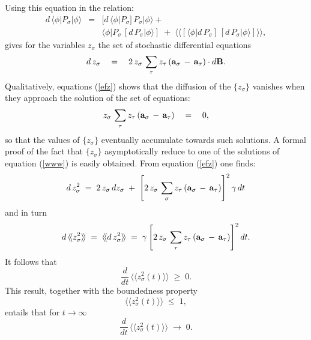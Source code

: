 \documentclass[12pt]{article}
\newcommand{\llangle}{\langle\!\langle}
\newcommand{\rrangle}{\rangle\!\rangle}
\begin{document}
Using this equation in the relation:
\begin{eqnarray*}
d\, \langle \phi|P_{\sigma}|\phi \rangle & = & [d\,\langle
\phi|P_{\sigma}]\,P_{\sigma}|
\phi \rangle + \\
& & \langle \phi|P_{\sigma} \,[d\,P_{\sigma}|\phi \rangle] \; + \;
\llangle [\langle \phi|d\,P_{\sigma}] \,[d\,P_{\sigma}|\phi
\rangle] \rrangle,
\end{eqnarray*}
gives for the variables $z_{\sigma}$ the set of stochastic
differential equations
\begin{equation} \label{efz}
d\,z_{\sigma} \quad = \quad 2\,z_{\sigma}\, \sum_{\tau} z_{\tau}\,
({\bf a}_{\sigma} \, - \, {\bf a}_{\tau})\cdot d{\bf B}.
\end{equation}
Qualitatively, equations (\ref{efz}) shows that the diffusion of the
$\{z_{\sigma}\}$ vanishes when they approach the
solution of the set of equations:
\begin{equation} \label{www}
z_{\sigma}\, \sum_{\tau} z_{\tau} \, ({\bf a}_{\sigma} \, - \,
{\bf a}_{\tau}) \quad = \quad 0,
\end{equation}
so that the values of $\{z_{\sigma}\}$ eventually accumulate
towards such solutions. A formal proof of the fact that
$\{z_{\sigma}\}$ asymptotically reduce to one of the solutions of
equation (\ref{www}) is easily obtained. From equation (\ref{efz})
one finds:
\begin{equation}
d\, z^{2}_{\sigma} \; = \; 2\,z_{\sigma}\, dz_{\sigma} \; + \;
\left[ 2\,z_{\sigma}\, \sum_{\sigma} z_{\tau}\, ({\bf a}_{\sigma}
\, - \, {\bf a}_{\tau}) \right]^{2} \gamma\, dt
\end{equation}
and in turn
\begin{equation} \label{vmz}
d\, \llangle z^{2}_{\sigma} \rrangle \; = \; \llangle d\,
z^{2}_{\sigma} \rrangle \; = \; \gamma \left[2\,z_{\sigma}\,
\sum_{\tau} z_{\tau}\, ({\bf a}_{\sigma} \, - \, {\bf a}_{\tau})
\right]^{2} dt.
\end{equation}
It follows that
\begin{equation}
\frac{d}{dt}\, \llangle z^{2}_{\sigma}(t) \rrangle \; \geq \; 0.
\end{equation}
This result, together with the boundedness property
\begin{equation}
\llangle z^{2}_{\sigma}(t) \rrangle \; \leq \; 1,
\end{equation}
entails that for $t \rightarrow \infty$
\begin{equation}
\frac{d}{dt}\, \llangle z^{2}_{\sigma}(t) \rrangle \;
\longrightarrow \; 0.
\end{equation}
\end{document}
